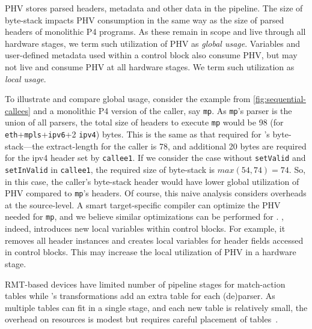 \documentclass[letterpaper,twocolumn,10pt]{article}
\begin{document}
 PHV stores parsed headers,
metadata and other data in the pipeline. The size of \ulang byte-stack
impacts PHV consumption in the same way as the size of parsed headers
of monolithic P4 programs. As these remain in scope and live through
all hardware stages, we term such utilization of PHV as \emph{global
usage}. Variables and user-defined metadata used within a control
block also consume PHV, but may not live and consume PHV at all
hardware stages. We term such utilization as \emph{local usage}.

To illustrate and compare global usage, consider the example from
\cref{fig:sequential-callees} and a monolithic P4 version of the
caller, say \texttt{mp}. As \texttt{mp}'s parser is the union of all
parsers, the total size of headers to execute \texttt{mp} would be 98
(for \texttt{eth}+\texttt{mpls}+\texttt{ipv6}+2 \texttt{ipv4}) bytes.
This is the same as that required for \ulang's byte-stack---the
extract-length for the caller is 78, and additional 20 bytes are
required for the ipv4 header set by \texttt{callee1}.  If we consider
the case without \texttt{setValid} and \texttt{setInValid} in
\texttt{callee1}, the required size of byte-stack is $max(54, 74) =
74$. So, in this case, the caller's byte-stack header would have lower
global utilization of PHV compared to \texttt{mp}'s headers. Of
course, this naive analysis considers overheads at the source-level. A
smart target-specific compiler can optimize the PHV needed for
\texttt{mp}, and we believe similar optimizations can be performed for
\ulang. \ucomp, indeed, introduces new local variables within control
blocks.  For example, it removes all header instances and creates
local variables for header fields accessed in control blocks. This may
increase the local utilization of PHV in a hardware stage.



%
RMT-based devices have limited number of pipeline stages for
match-action tables while \ucomp's transformations add an extra table
for each (de)parser. As multiple tables can fit in a single stage, and
each new table is relatively small, the overhead on resources is
modest but requires careful placement of
tables~\cite{jose2015compiling}.
\end{document}
